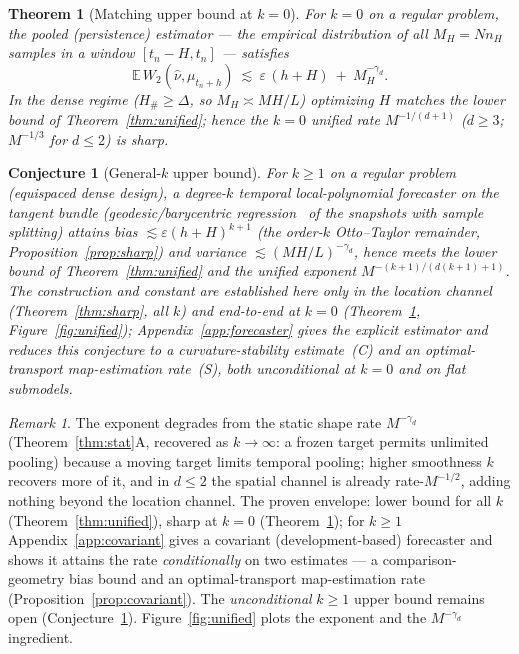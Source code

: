 \documentclass[11pt]{article}
\newtheorem{theorem}{Theorem}
\newtheorem{conjecture}{Conjecture}
\theoremstyle{definition}
\theoremstyle{remark}
\newtheorem{remark}{Remark}
\newcommand{\E}{\mathbb{E}}
\begin{document}
\begin{theorem}[Matching upper bound at $k=0$]\label{thm:upper0}
For $k=0$ on a regular problem, the pooled (persistence) estimator --- the empirical
distribution of all $M_H=N n_H$ samples in a window $[t_n-H,t_n]$ --- satisfies
\[
   \E\,W_2(\hat\nu,\mu_{t_n+h})\ \lesssim\ \varepsilon\,(h+H)\ +\ M_H^{-\gamma_d}.
\]
In the dense regime ($H_\#\ge\Delta$, so $M_H\asymp MH/L$) optimizing $H$ matches the lower bound of
Theorem~\ref{thm:unified}; hence the $k=0$ unified rate $M^{-1/(d+1)}$ ($d\ge3$; $M^{-1/3}$ for
$d\le2$) is sharp.
\end{theorem}

\begin{conjecture}[General-$k$ upper bound]\label{conj:upper}
For $k\ge1$ on a regular problem (equispaced dense design), a degree-$k$ temporal local-polynomial forecaster on the
tangent bundle (geodesic/barycentric regression~\cite{fletcher} of the snapshots with sample splitting) attains
bias $\lesssim\varepsilon(h+H)^{k+1}$ (the order-$k$ Otto--Taylor remainder,
Proposition~\ref{prop:sharp}) and variance $\lesssim(MH/L)^{-\gamma_d}$, hence meets the lower
bound of Theorem~\ref{thm:unified} and the unified exponent $M^{-(k+1)/(d(k+1)+1)}$. The
construction and constant are established here only in the location channel
(Theorem~\ref{thm:sharp}, all $k$) and end-to-end at $k=0$ (Theorem~\ref{thm:upper0},
Figure~\ref{fig:unified}); Appendix~\ref{app:forecaster} gives the explicit estimator and reduces
this conjecture to a curvature-stability estimate~(C) and an optimal-transport map-estimation
rate~(S), both unconditional at $k=0$ and on flat submodels.
\end{conjecture}

\begin{remark}
The exponent degrades from the static shape rate $M^{-\gamma_d}$ (Theorem~\ref{thm:stat}A, recovered
as $k\to\infty$: a frozen target permits unlimited pooling) because a moving target limits
temporal pooling; higher smoothness $k$ recovers more of it, and in $d\le2$ the spatial channel
is already rate-$M^{-1/2}$, adding nothing beyond the location channel. The proven envelope:
lower bound for all $k$ (Theorem~\ref{thm:unified}), sharp at $k=0$
(Theorem~\ref{thm:upper0}); for $k\ge1$ Appendix~\ref{app:covariant} gives a covariant
(development-based) forecaster and shows it attains the rate \emph{conditionally} on two estimates
--- a comparison-geometry bias bound and an optimal-transport map-estimation rate
(Proposition~\ref{prop:covariant}). The \emph{unconditional} $k\ge1$ upper bound remains open
(Conjecture~\ref{conj:upper}).
Figure~\ref{fig:unified} plots the exponent and the $M^{-\gamma_d}$ ingredient.
\end{remark}
\end{document}
